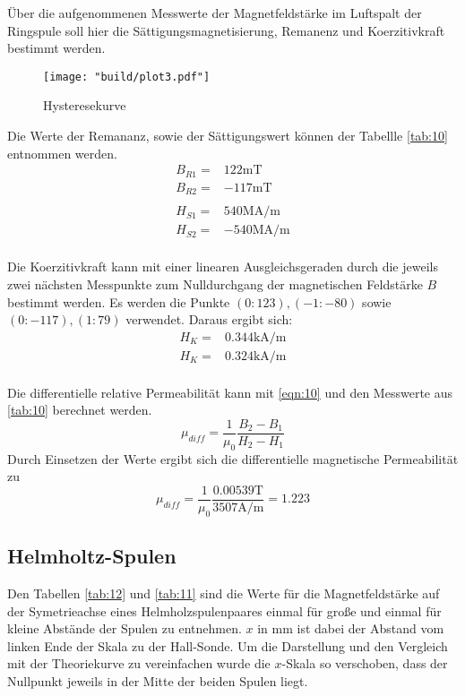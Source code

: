 Über die aufgenommenen Messwerte der Magnetfeldstärke im Luftspalt der Ringspule soll hier 
die Sättigungsmagnetisierung, Remanenz und Koerzitivkraft bestimmt werden.
\begin{figure}[H]
    \caption{Hysteresekurve}
    \label{fig:3}
    \centering
    \texttt{[image: "build/plot3.pdf"]}
\end{figure}
\noindent Die Werte der Remananz, sowie der Sättigungswert können der Tabellle 
\autoref{tab:10} entnommen werden.
\begin{align*}
    B_{R1} =& 122 \unit{\milli\tesla}\\
    B_{R2} =& -117 \unit{\milli\tesla}\\
&\\
    H_{S1} =& 540 \unit{\mega\ampere\per\meter}\\
    H_{S2} =& -540 \unit{\mega\ampere\per\meter}\\
\end{align*}

\noindent Die Koerzitivkraft kann mit einer linearen Ausgleichsgeraden durch
die jeweils zwei nächsten Messpunkte zum Nulldurchgang der magnetischen
Feldstärke $B$ bestimmt werden. Es werden die Punkte
$(0:123),(-1:-80)$ sowie $(0:-117),(1:79)$ verwendet. Daraus ergibt sich:
\begin{align*}
    H_{K} =& 0.344 \unit{\kilo\ampere\per\meter}\\
    H_{K} =& 0.324 \unit{\kilo\ampere\per\meter}\\
\end{align*}

\noindent Die differentielle relative Permeabilität kann mit \autoref{eqn:10}
und den Messwerte aus \autoref{tab:10} berechnet werden. 
\begin{equation}
    \mu_{diff} = \frac{1}{\mu_0} \frac{B_2 - B_1}{H_2 - H_1}
\end{equation}
\noindent Durch Einsetzen der Werte ergibt sich die differentielle magnetische
Permeabilität zu
\begin{equation}
    \mu_{diff} = \frac{1}{\mu_0} \frac{0.00539 \unit{\tesla}}{3507 \unit{\ampere\per\meter}} = 1.223
\end{equation}





\subsection{Helmholtz-Spulen}
Den Tabellen \autoref{tab:12} und \autoref{tab:11} sind die Werte für die Magnetfeldstärke auf der 
Symetrieachse eines Helmholzspulenpaares einmal für große und einmal für kleine 
Abstände der Spulen zu entnehmen. $x$ in $\unit{\milli\meter} $ ist dabei der
Abstand vom linken Ende der Skala zu der Hall-Sonde. Um die Darstellung und den Vergleich mit der 
Theoriekurve zu vereinfachen wurde die $x$-Skala so verschoben, dass der Nullpunkt
jeweils in der Mitte der beiden Spulen liegt.

